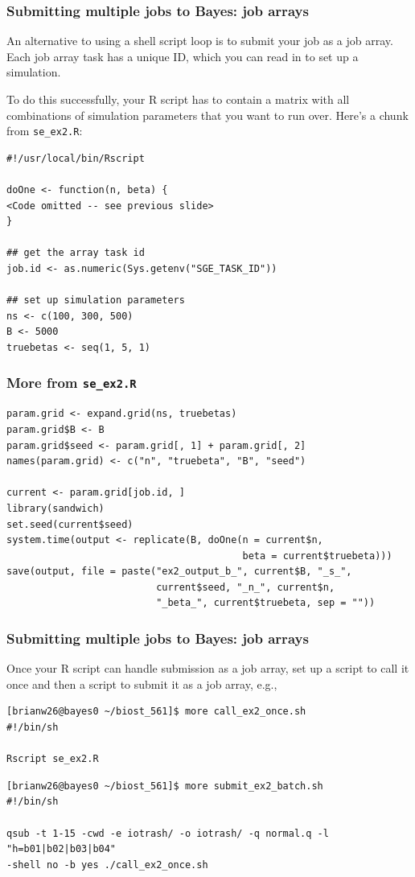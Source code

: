 \documentclass[12pt, 
hyperref={colorlinks=true, linkcolor=blue, urlcolor=cyan}]{beamer}
\begin{document}
\begin{frame}[fragile]
\frametitle{Submitting multiple jobs to Bayes: job arrays}
An alternative to using a shell script loop is to submit your job as a job array. Each job array task has a unique ID, which you can read in to set up a simulation.

To do this successfully, your R script has to contain a matrix with all combinations of simulation parameters that you want to run over. Here's a chunk from \texttt{se\_ex2.R}:
{\scriptsize
\begin{verbatim}
#!/usr/local/bin/Rscript

doOne <- function(n, beta) {
<Code omitted -- see previous slide>
}

## get the array task id
job.id <- as.numeric(Sys.getenv("SGE_TASK_ID"))

## set up simulation parameters
ns <- c(100, 300, 500)
B <- 5000
truebetas <- seq(1, 5, 1)
\end{verbatim}
}
\end{frame}

\begin{frame}[fragile]
\frametitle{More from \texttt{se\_ex2.R}}
{\scriptsize
\begin{verbatim}
param.grid <- expand.grid(ns, truebetas)
param.grid$B <- B
param.grid$seed <- param.grid[, 1] + param.grid[, 2]
names(param.grid) <- c("n", "truebeta", "B", "seed")

current <- param.grid[job.id, ]
library(sandwich)
set.seed(current$seed)
system.time(output <- replicate(B, doOne(n = current$n, 
                                         beta = current$truebeta)))
save(output, file = paste("ex2_output_b_", current$B, "_s_", 
                          current$seed, "_n_", current$n, 
                          "_beta_", current$truebeta, sep = ""))
\end{verbatim}
}
\end{frame}

\begin{frame}[fragile]
\frametitle{Submitting multiple jobs to Bayes: job arrays}
Once your R script can handle submission as a job array, set up a script to call it once and then a script to submit it as a job array, e.g.,
{\scriptsize
\begin{verbatim}
[brianw26@bayes0 ~/biost_561]$ more call_ex2_once.sh
#!/bin/sh

Rscript se_ex2.R
\end{verbatim}
\begin{verbatim}
[brianw26@bayes0 ~/biost_561]$ more submit_ex2_batch.sh
#!/bin/sh

qsub -t 1-15 -cwd -e iotrash/ -o iotrash/ -q normal.q -l "h=b01|b02|b03|b04" 
-shell no -b yes ./call_ex2_once.sh
\end{verbatim}
}
\end{frame}
\end{document}
